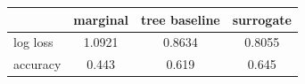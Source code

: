 \begin{tabular}{lccc}
\toprule
 & marginal & tree baseline & surrogate \\
\midrule
log loss & 1.0921 & 0.8634 & 0.8055 \\
accuracy & 0.443 & 0.619 & 0.645 \\
\bottomrule
\end{tabular}
